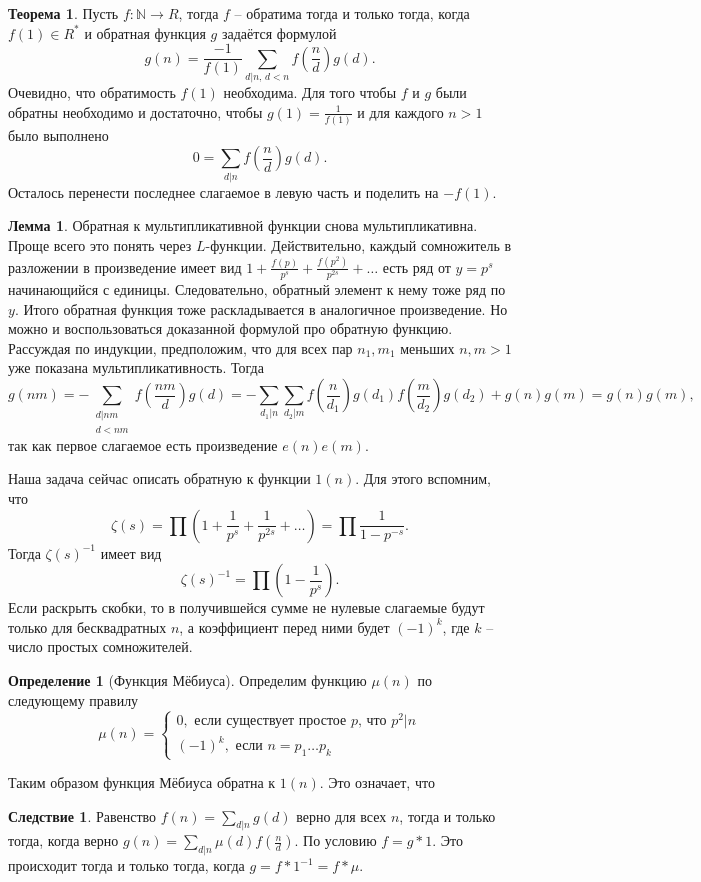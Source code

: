 \documentclass[10pt,a4paper,oneside]{book}
\theoremstyle{definition}
\newtheorem*{defn}{{\color{yellow!30!red} Определение}}
\newtheorem{thm}{{\color{red!40!black} Теорема}}
\newtheorem{lem}{{\color{green!50!black} Лемма}}
\newtheorem{cor}{Следствие}
\newcommand{\mb}[1]{\mathbb{#1}}
\def\thrm{\begin{thm}}
\def\ethrm{\end{thm}}
\def\dfn{\begin{defn}}
\def\edfn{\end{defn}}
\def\lm{\begin{lem}}
\def\elm{\end{lem}}
\def\crl{\begin{cor}}
\def\ecrl{\end{cor}}
\begin{document}
\thrm Пусть $f\colon \mb N \to R$, тогда $f$ -- обратима тогда и только тогда, когда $f(1)\in R^*$ и обратная функция $g$ задаётся формулой
$$g(n)=\frac{-1}{f(1)}\sum_{d|n,\, d<n} f\left(\frac{n}{d}\right)g(d).$$
\proof Очевидно, что обратимость $f(1)$ необходима. Для того чтобы $f$ и $g$ были обратны необходимо и достаточно, чтобы $g(1)=\frac{1}{f(1)}$ и для каждого $n>1$ было выполнено
$$0=\sum_{d |n} f\left(\frac{n}{d}\right)g(d).$$
Осталось перенести последнее слагаемое в левую часть и поделить на $-f(1)$.
\endproof
\ethrm

\lm Обратная к мультипликативной функции снова мультипликативна.
\proof Проще всего это понять через $L$-функции. Действительно, каждый сомножитель в разложении в произведение имеет вид $1+\frac{f(p)}{p^s}+\frac{f(p^2)}{p^{2s}}+\dots$ есть ряд от $y=p^s$ начинающийся с единицы. Следовательно, обратный элемент к нему тоже ряд по $y$. Итого обратная функция тоже раскладывается в аналогичное произведение. 
Но можно и воспользоваться доказанной формулой про обратную функцию. Рассуждая по индукции, предположим, что для всех пар $n_1,m_1$ меньших $n,m>1$ уже показана мультипликативность. Тогда 
$$g(nm)=-\sum_{\substack{d|nm\\ d<nm}} f\left(\frac{nm}{d}\right)g(d)=-\sum_{d_1|n}\sum_{d_2|m} f\left(\frac{n}{d_1}\right)g(d_1)f\left(\frac{m}{d_2}\right)g(d_2)+g(n)g(m)=g(n)g(m),$$
так как первое слагаемое есть произведение $e(n)e(m)$. 
\endproof
\elm

Наша задача сейчас описать обратную к функции $1(n)$. Для этого вспомним, что $$\zeta(s)=\prod\left(1+\frac{1}{p^s}+\frac{1}{p^{2s}}+\dots\right)= \prod \frac{1}{1-p^{-s}}.$$
Тогда $\zeta(s)^{-1}$ имеет вид
$$\zeta(s)^{-1}=\prod\left(1-\frac{1}{p^{s}}\right).$$
Если раскрыть скобки, то в получившейся сумме не нулевые слагаемые будут только для бесквадратных $n$, а коэффициент перед ними будет $(-1)^k$, где $k$ -- число простых сомножителей.

\dfn[Функция Мёбиуса] Определим функцию $\mu(n)$ по следующему правилу
$$\mu(n)=\begin{cases}
0, \text{ если существует простое $p$, что $p^2|n$}\\
(-1)^k, \text{ если $n=p_1\dots p_k$}
\end{cases}$$
\edfn

Таким образом функция Мёбиуса обратна к $1(n)$. Это означает, что 
\crl Равенство $f(n)=\sum_{d|n} g(d)$ верно для всех $n$, тогда и только тогда, когда верно $g(n)=\sum_{d|n} \mu(d)f(\frac{n}{d})$.
\proof По условию $f=g*1$. Это происходит тогда и только тогда, когда $g=f*1^{-1}=f*\mu$.
\endproof
\ecrl
\end{document}
